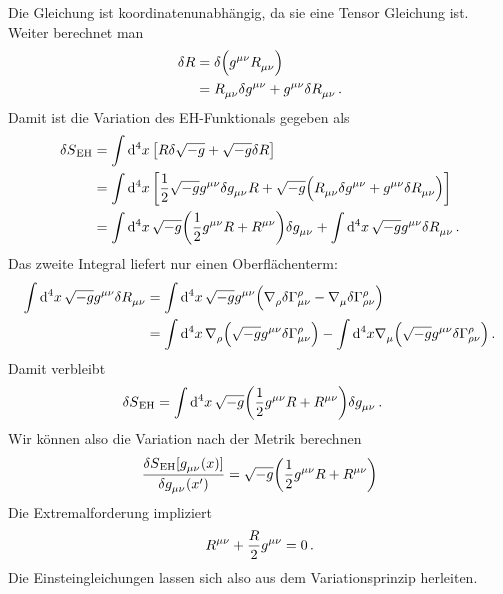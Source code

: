 Die Gleichung ist koordinatenunabhängig, da sie eine Tensor Gleichung ist.
Weiter berechnet man 
\begin{equation}
\begin{split}
\delta R &=\delta \left(\tensor{g}{^\mu^\nu}\tensor{R}{_\mu_\nu}\right)\\
&=\tensor{R}{_\mu_\nu}\delta\tensor{g}{^\mu^\nu}
+\tensor{g}{^\mu^\nu}\delta\tensor{R}{_\mu_\nu}\,.
\end{split}
\end{equation}
Damit ist die Variation des EH-Funktionals gegeben als
\begin{equation}
\begin{split}
\delta S\textsubscript{EH}
&=\fourint \left[
R\delta\sqrt{-g}+\sqrt{-g}\delta R\right]\\
&=\fourint \left[
\frac{1}{2}\sqrt{-g}\tensor{g}{^\mu^\nu}\delta\tensor{g}{_\mu_\nu}
R+\sqrt{-g}\left(\tensor{R}{_\mu_\nu}\delta\tensor{g}{^\mu^\nu}
+\tensor{g}{^\mu^\nu}\delta\tensor{R}{_\mu_\nu}\right)\right]\\
&=\fourint \sqrt{-g}\left(
\frac{1}{2}\tensor{g}{^\mu^\nu}
R+\tensor{R}{^\mu^\nu}\right)\delta\tensor{g}{_\mu_\nu}
+\fourint \sqrt{-g}\tensor{g}{^\mu^\nu}\delta\tensor{R}{_\mu_\nu}
\,.
\end{split}
\end{equation}
Das zweite Integral liefert nur einen Oberflächenterm:
\begin{equation}
\begin{split}
\fourint \sqrt{-g}\tensor{g}{^\mu^\nu}\delta\tensor{R}{_\mu_\nu}
&=\fourint \sqrt{-g}\tensor{g}{^\mu^\nu}\left(\tensor{\nabla}{_\rho}\delta
\cSym{\rho}{\mu}{\nu} -\tensor{\nabla}{_\mu}\delta \cSym{\rho}{\rho}{\nu}\right)
\\
&=\fourint \tensor{\nabla}{_\rho}\left(\sqrt{-g}\tensor{g}{^\mu^\nu}\delta
\cSym{\rho}{\mu}{\nu}\right)-\int\dif{}^4 x \tensor{\nabla}{_\mu}\left(\sqrt{-g}\tensor{g}{^\mu^\nu}\delta
\cSym{\rho}{\rho}{\nu}\right)\,.
\end{split}
\end{equation}
Damit verbleibt 
\begin{equation}
\begin{split}
\delta S\textsubscript{EH}
&=\fourint \sqrt{-g}\left(
\frac{1}{2}\tensor{g}{^\mu^\nu}
R+\tensor{R}{^\mu^\nu}\right)\delta\tensor{g}{_\mu_\nu}\,.
\end{split}
\end{equation}
Wir können also die Variation nach der Metrik berechnen 
\begin{equation}
\frac{\delta
S\textsubscript{EH}[\tensor{g}{_\mu_\nu}(x)]}{\delta\tensor{g}{_\mu_\nu}(x')}
=\sqrt{-g}\left(\frac{1}{2}\tensor{g}{^\mu^\nu}
R+\tensor{R}{^\mu^\nu}\right)
\end{equation}
Die Extremalforderung impliziert
\begin{equation}
\tensor{R}{^\mu^\nu}+\frac{R}{2}\tensor{g}{^\mu^\nu}=0\, .
\end{equation}
Die Einsteingleichungen lassen sich also aus dem Variationsprinzip herleiten.
